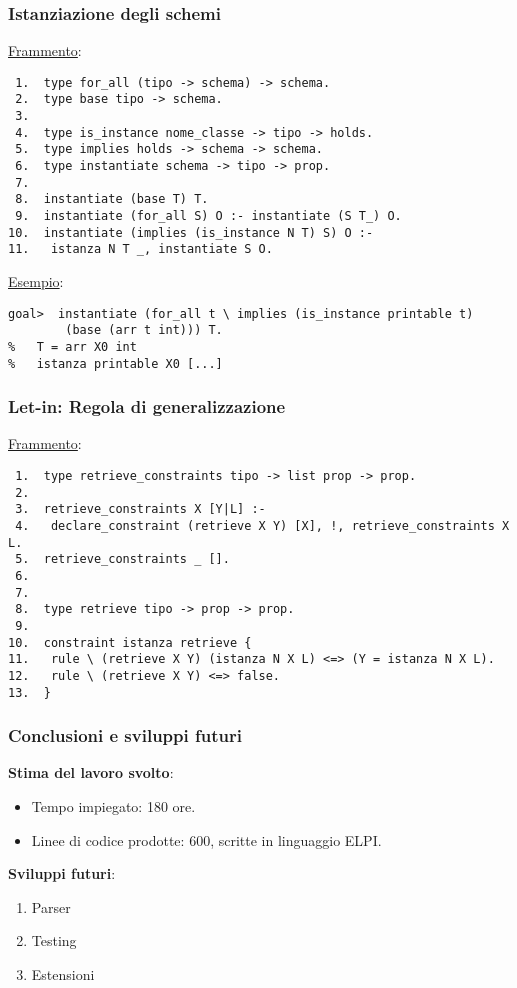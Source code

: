 \documentclass{beamer}
\begin{document}
\begin{frame}[fragile=singleslide]      %

 \frametitle{Istanziazione degli schemi}

 \underline{Frammento}:
 \begin{verbatim}
 1.  type for_all (tipo -> schema) -> schema.
 2.  type base tipo -> schema.
 3.
 4.  type is_instance nome_classe -> tipo -> holds.
 5.  type implies holds -> schema -> schema.
 6.  type instantiate schema -> tipo -> prop.
 7.
 8.  instantiate (base T) T.
 9.  instantiate (for_all S) O :- instantiate (S T_) O.
10.  instantiate (implies (is_instance N T) S) O :-
11.   istanza N T _, instantiate S O.
 \end{verbatim}

 \vfill

 \underline{Esempio}:
 \begin{verbatim}
goal>  instantiate (for_all t \ implies (is_instance printable t)
        (base (arr t int))) T.
%   T = arr X0 int
%   istanza printable X0 [...]
 \end{verbatim}

\end{frame}


\begin{frame}[fragile=singleslide]      %

 \frametitle{Let-in: Regola di generalizzazione}

 \underline{Frammento}:
 \begin{verbatim}
 1.  type retrieve_constraints tipo -> list prop -> prop.
 2.
 3.  retrieve_constraints X [Y|L] :-
 4.   declare_constraint (retrieve X Y) [X], !, retrieve_constraints X L.
 5.  retrieve_constraints _ [].
 6.
 7.
 8.  type retrieve tipo -> prop -> prop.
 9.
10.  constraint istanza retrieve {
11.   rule \ (retrieve X Y) (istanza N X L) <=> (Y = istanza N X L).
12.   rule \ (retrieve X Y) <=> false.
13.  }
 \end{verbatim}

\end{frame}


\begin{frame}

 \frametitle{Conclusioni e sviluppi futuri}

 \textbf{Stima del lavoro svolto}:
 \begin{itemize}
  \item Tempo impiegato: 180 ore.
  \item Linee di codice prodotte: 600, scritte in linguaggio ELPI.
 \end{itemize}

 \vfill

 \textbf{Sviluppi futuri}:
 \begin{enumerate}
  \item Parser
  \item Testing
  \item Estensioni
 \end{enumerate}

\end{frame}
\end{document}
